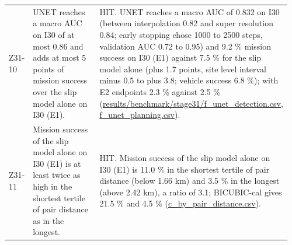 \documentclass[10pt]{article}
\begin{document}
\begin{longtable}{@{}p{0.08\linewidth}p{0.42\linewidth}p{0.46\linewidth}@{}}
Z31-10 & UNET reaches a macro AUC on I30 of at most 0.86 and adds at most 5 points of mission success over the slip model alone on I30 (E1). & HIT. UNET reaches a macro AUC of 0.832 on I30 (between interpolation 0.82 and super resolution 0.84; early stopping chose 1000 to 2500 steps, validation AUC 0.72 to 0.95) and 9.2 \% mission success on I30 (E1) against 7.5 \% for the slip model alone (plus 1.7 points, site level interval minus 0.5 to plus 3.8; vehicle success 6.8 \%); with E2 endpoints 2.3 \% against 2.5 \% (\url{results/benchmark/stage31/f_unet_detection.csv}, \url{f_unet_planning.csv}). \\
Z31-11 & Mission success of the slip model alone on I30 (E1) is at least twice as high in the shortest tertile of pair distance as in the longest. & HIT. Mission success of the slip model alone on I30 (E1) is 11.0 \% in the shortest tertile of pair distance (below 1.66 km) and 3.5 \% in the longest (above 2.42 km), a ratio of 3.1; BICUBIC-cal gives 21.5 \% and 4.5 \% (\url{c_by_pair_distance.csv}). \\
\bottomrule
\end{longtable}
\end{document}
